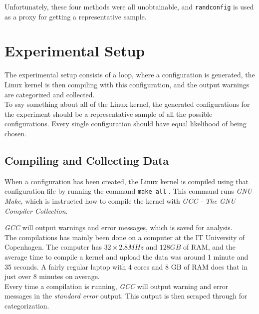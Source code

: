 \documentclass[a4paper,11pt]{report}
\newcommand{\textcode}[1]{
    \fboxsep=1pt
    \texttt{\colorbox{gray!20}{#1}}
}
\begin{document}
Unfortunately, these four methods were all unobtainable, and 
\texttt{randconfig} is used as a proxy for getting a representative sample.

            \section{Experimental Setup}
The experimental setup consists of a loop, where a configuration is generated,
the Linux kernel is then compiling with this configuration, and the output 
warnings are categorized and collected.
\\

To say something about all of the Linux kernel, the generated configurations 
for the experiment should be a representative sample of all the possible 
configurations. Every single configuration should have equal likelihood of being
chosen. 


            \subsection{Compiling and Collecting Data}
When a configuration has been created, the Linux kernel is compiled using 
that configuration file by running the command \textcode{make all}. This 
command runs \emph{GNU Make}, which is instructed how to compile the kernel with
\emph{GCC - The GNU Compiler Collection}.

\emph{GCC} will output warnings and error messages, which is saved for analysis.
\\

The compilations has mainly been done on a computer at the IT University 
of Copenhagen. The computer has $32\times2.8 MHz$ and $128 GB$ of RAM, and the 
average time to compile a kernel and upload the data was around 1 minute and 35 
seconds. A fairly regular laptop with 4 cores and 8 GB of RAM does that in just 
over 8 minutes on average. 
\\




Every time a compilation is running, \emph{GCC} will output warning and error 
messages in the \emph{standard error} output. This output is then scraped 
through for categorization.
\end{document}
